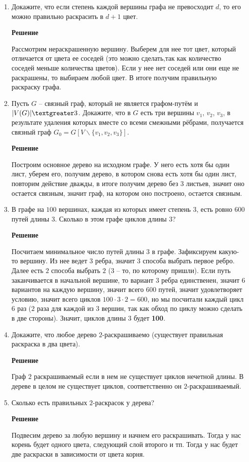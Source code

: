 \documentclass[12pt]{article}
\begin{document}
\begin{enumerate}[label={\textbf{\arabic{section}.\arabic*}}]
		\item Докажите, что если степень каждой вершины графа не превосходит $d$, то его можно правильно раскрасить в $d + 1$ цвет.
		
		\textbf{Решение}
		
		Рассмотрим нераскрашенную вершину. Выберем для нее тот цвет, который отличается от цвета ее соседей (это можно сделать,так как количество соседей меньше количества цветов). Если у нее нет соседей или они еще не раскрашены, то выбираем любой цвет. В итоге получим правильную раскраску графа.
		
		\item Пусть $G$ -- связный граф, который не является графом-путём и $|V (G)| \textgreater 3$. Докажите, что в $G$ есть три вершины $v_1$, $v_2$, $v_3$, в результате удаления которых вместе со всеми смежными рёбрами, получается
		связный граф $G_0 = G[V \backslash \{v_1, v_2, v_3\}]$.
		
		\textbf{Решение}
		
		Построим основное дерево на исходном графе. У него есть хотя бы один лист, уберем его, получим дерево, в котором снова есть хотя бы один лист, повторим действие дважды, в итоге получим дерево без $3$ листьев, значит оно остается связным, значит граф, на котором оно построено, остается связным.
		
		\item В графе на $100$ вершинах, каждая из которых имеет степень $3$, есть ровно $600$ путей длины $3$. Сколько в этом графе циклов длины $3$?
		
		\textbf{Решение}
		
		Посчитаем минимальное число путей длины $3$ в графе. Зафиксируем какую-то вершину. Из нее ведет $3$ ребра, значит $3$ способа выбрать первое ребро. Далее есть $2$ способа выбрать $2$ ($3$ -- то, по которому пришли). Если путь заканчивается в начальной вершине, то вариант $3$ ребра единственен, значит $6$ вариантов на каждую вершину, значит всего $600$ путей, значит удовлетворяет условию, значит всего циклов $100\cdot3\cdot2 = 600$, но мы посчитали каждый цикл $6$ раз ($2$ раза для каждой из $3$ вершин, так как	обход по циклу можно сделать в две стороны). Значит, циклов длины $3$ будет \textbf{100}.

		
		\item Докажите, что любое дерево $2$-раскрашиваемо (существует правильная раскраска в два цвета).
		
		\textbf{Решение}
		
		Граф $2$ раскрашиваемый если в нем не существует циклов нечетной длины. В дереве в целом не существует циклов, соответственно он $2$-раскрашиваемый.
		
		\item Сколько есть правильных $2$-раскрасок у дерева?
		
		\textbf{Решение}
		
		Подвесим дерево за любую вершину и начнем его раскрашивать. Тогда у нас корень будет одного цвета, следующий слой второго и тп. Тогда у нас будет две раскраски в зависимости от цвета корня.
	\end{enumerate}
	\newpage
\end{document}
